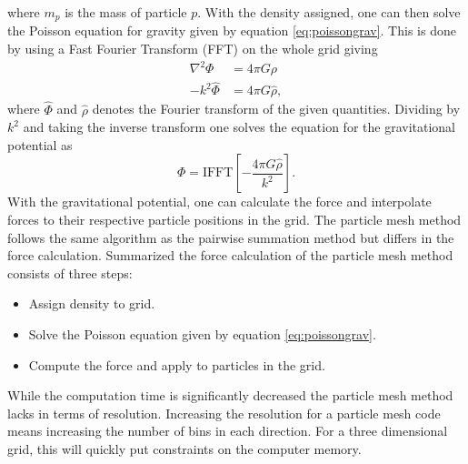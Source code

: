 where $m_p$ is the mass of particle $p$.
With the density assigned, one can then solve the Poisson equation for gravity given
by equation \ref{eq:poissongrav}. This is done by using a Fast Fourier Transform
(FFT) on the whole grid giving
\begin{align}
    \nabla^2\Phi&=4\pi G\rho\\
    -k^2 \hat{\Phi}&=4\pi G \hat{\rho},
\end{align}
where $\hat{\Phi}$ and $\hat{\rho}$ denotes the Fourier transform of the given
quantities. Dividing by $k^2$ and taking the inverse transform one solves the
equation for the gravitational potential as
\begin{equation}
    \Phi = \mathrm{IFFT}[-\frac{4\pi G \hat{\rho}}{k^2}].
\end{equation}
With the gravitational potential, one can calculate the force and interpolate
forces to their respective particle positions in the grid. The particle mesh
method follows the same algorithm as the pairwise summation method but differs
in the force calculation. Summarized the force calculation of the particle mesh
method consists of three steps:
\begin{itemize}
    \item Assign density to grid. \\
    \item Solve the Poisson equation given by equation \ref{eq:poissongrav}.\\
    \item Compute the force and apply to particles in the grid.
\end{itemize}
While the computation time is significantly decreased the
particle mesh method lacks in terms of resolution. Increasing the resolution for a
particle mesh code means increasing the number of bins in each direction. For a
three dimensional grid, this will quickly put constraints on the computer memory.
